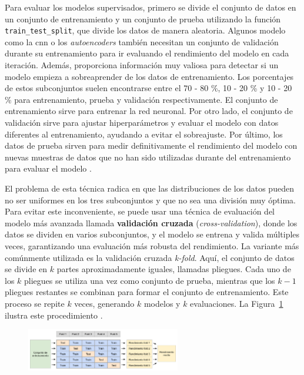 Para evaluar los modelos supervisados, primero se divide el conjunto de datos en un conjunto de entrenamiento y un conjunto de prueba utilizando la función \lstinline|train_test_split|, que divide los datos de manera aleatoria. Algunos modelo como la \acrshort{cnn} o los \textit{autoencoders} también necesitan un conjunto de validación durante su entrenamiento para ir evaluando el rendimiento del modelo en cada iteración. Además, proporciona información muy valiosa para detectar si un modelo empieza a sobreaprender de los datos de entrenamiento. Los porcentajes de estos subconjuntos suelen encontrarse entre el 70 - 80 \%, 10 - 20 \% y 10 - 20 \% para entrenamiento, prueba y validación respectivamente. El conjunto de entrenamiento sirve para entrenar la red neuronal. Por otro lado, el conjunto de validación sirve para ajustar hiperparámetros y evaluar el modelo con datos diferentes al entrenamiento, ayudando a evitar el sobreajuste. Por último, los datos de prueba sirven para medir definitivamente el rendimiento del modelo con nuevas muestras de datos que no han sido utilizadas durante del entrenamiento para evaluar el modelo \citep{muller2016introduction}.


El problema de esta técnica radica en que las distribuciones de los datos pueden no ser uniformes en los tres subconjuntos y que no sea una división muy óptima. Para evitar este inconveniente, se puede usar una técnica de evaluación del modelo más avanzada llamada \textbf{validación cruzada} (\textit{cross-validation}), donde los datos se dividen en varios subconjuntos, y el modelo se entrena y valida múltiples veces, garantizando una evaluación más robusta del rendimiento. La variante más comúnmente utilizada es la validación cruzada \textit{k-fold}. Aquí, el conjunto de datos se divide en $k$ partes aproximadamente iguales, llamadas pliegues. Cada uno de los $k$ pliegues se utiliza una vez como conjunto de prueba, mientras que los $k-1$ pliegues restantes se combinan para formar el conjunto de entrenamiento. Este proceso se repite $k$ veces, generando $k$ modelos y $k$ evaluaciones. La Figura~\ref{img: k-fold} ilustra este procedimiento \citep{muller2016introduction}.

\begin{figure}[h]
	\centering
    \includegraphics[width=0.6\textwidth]{img/kfold.png}
    \label{img: k-fold}
\end{figure}

